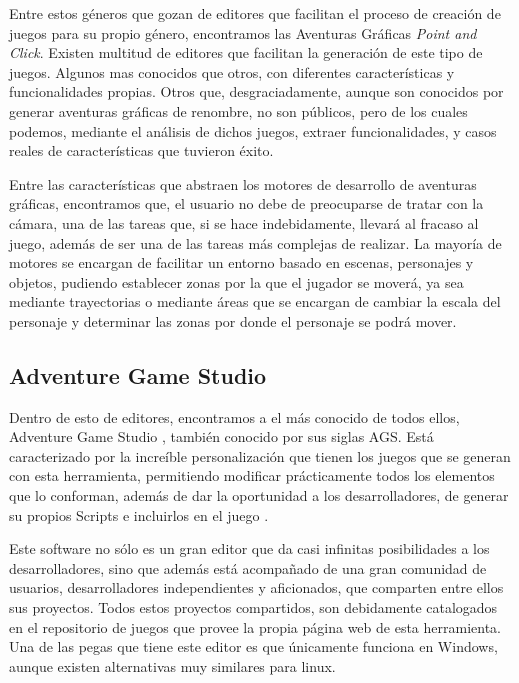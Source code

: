 Entre estos géneros que gozan de editores que facilitan el proceso de creación de juegos para su propio género, encontramos las Aventuras Gráficas \textit{Point and Click}. Existen multitud de editores que facilitan la generación de este tipo de juegos. Algunos mas conocidos que otros, con diferentes características y funcionalidades propias. Otros que, desgraciadamente, aunque son conocidos por generar aventuras gráficas de renombre, no son públicos, pero de los cuales podemos, mediante el análisis de dichos juegos, extraer funcionalidades, y casos reales de características que tuvieron éxito.

Entre las características que abstraen los motores de desarrollo de aventuras gráficas, encontramos que, el usuario no debe de preocuparse de tratar con la cámara, una de las tareas que, si se hace indebidamente, llevará al fracaso al juego, además de ser una de las tareas más complejas de realizar. La mayoría de motores se encargan de facilitar un entorno basado en escenas, personajes y objetos, pudiendo establecer zonas por la que el jugador se moverá, ya sea mediante trayectorias o mediante áreas que se encargan de cambiar la escala del personaje y determinar las zonas por donde el personaje se podrá mover.

\subsection{Adventure Game Studio}
\label{adventuregamestudio}

Dentro de esto de editores, encontramos a el más conocido de todos ellos, Adventure Game Studio \cite{agsmanual}, también conocido por sus siglas AGS. Está caracterizado por la increíble personalización que tienen los juegos que se generan con esta herramienta, permitiendo modificar prácticamente todos los elementos que lo conforman, además de dar la oportunidad a los desarrolladores, de generar su propios Scripts e incluirlos en el juego \cite{adventuregamestudio}. 

Este software no sólo es un gran editor que da casi infinitas posibilidades a los desarrolladores, sino que además está acompañado de una gran comunidad de usuarios, desarrolladores independientes y aficionados, que comparten entre ellos sus proyectos. Todos estos proyectos compartidos, son debidamente catalogados en el repositorio de juegos que provee la propia página web de esta herramienta. Una de las pegas que tiene este editor es que únicamente funciona en Windows, aunque existen alternativas muy similares para linux.


